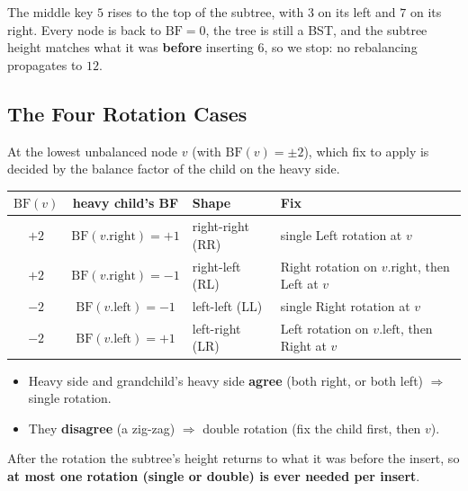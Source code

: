 \documentclass[11pt]{article}
\begin{document}
\begin{examplebox}
The middle key $5$ rises to the top of the subtree, with $3$ on its left and $7$ on its right. Every node is back to $\text{BF} = 0$, the tree is still a BST, and the subtree height matches what it was \textbf{before} inserting $6$, so we \textcolor{greenO}{stop}: no rebalancing propagates to $12$.
\end{examplebox}

\subsection{The Four Rotation Cases}

At the lowest unbalanced node $v$ (with $\text{BF}(v) = \pm 2$), which fix to apply is decided by the balance factor of the child on the heavy side.

\begin{keybox}
\renewcommand{\arraystretch}{1.55}
\begin{tabular}{c c l l}
\textbf{$\text{BF}(v)$} & \textbf{heavy child's BF} & \textbf{Shape} & \textbf{Fix}\\
\hline
$+2$ & $\text{BF}(v.\text{right}) = +1$ & right-right (RR) & \textcolor{rustW}{single Left rotation at $v$}\\
$+2$ & $\text{BF}(v.\text{right}) = -1$ & right-left (RL) & \textcolor{rustW}{Right rotation on $v.\text{right}$, then Left at $v$}\\
$-2$ & $\text{BF}(v.\text{left}) = -1$ & left-left (LL) & \textcolor{rustW}{single Right rotation at $v$}\\
$-2$ & $\text{BF}(v.\text{left}) = +1$ & left-right (LR) & \textcolor{rustW}{Left rotation on $v.\text{left}$, then Right at $v$}\\
\end{tabular}
\end{keybox}

\begin{keybox}
\begin{itemize}[leftmargin=1.4em,itemsep=1pt]
  \item Heavy side and grandchild's heavy side \textbf{agree} (both right, or both left) $\Rightarrow$ \textcolor{rustW}{single} rotation.
  \item They \textbf{disagree} (a zig-zag) $\Rightarrow$ \textcolor{rustW}{double} rotation (fix the child first, then $v$).
\end{itemize}
After the rotation the subtree's height returns to what it was before the insert, so \textbf{at most one rotation (single or double) is ever needed per insert}.
\end{keybox}
\end{document}
